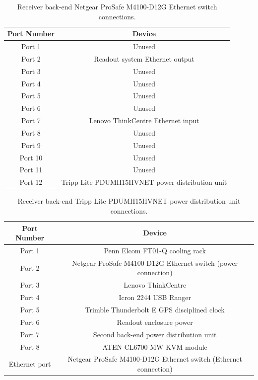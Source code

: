 \begin{table}
    \begin{center}
    \begin{tabular}{ |c|c| }
    \hline
    Port Number & Device \\
    \hline
    Port 1 & Unused \\
    Port 2 & Readout system Ethernet output \\
    Port 3 & Unused \\
    Port 4 & Unused \\
    Port 5 & Unused \\
    Port 6 & Unused \\
    Port 7 & Lenovo ThinkCentre Ethernet input \\
    Port 8 & Unused \\
    Port 9 & Unused \\
    Port 10 & Unused \\
    Port 11 & Unused \\
    Port 12 & Tripp Lite PDUMH15HVNET power distribution unit \\
    \hline
    \end{tabular}
    \caption{Receiver back-end Netgear ProSafe M4100-D12G Ethernet switch connections.}
    \label{tab:eth_switch}
    \end{center}
\end{table}

\begin{table}
    \begin{center}
    \begin{tabular}{ |c|c| }
    \hline
    Port Number & Device \\
    \hline
    Port 1 & Penn Elcom FT01-Q cooling rack\\
    Port 2 & Netgear ProSafe M4100-D12G Ethernet switch (power connection) \\
    Port 3 & Lenovo ThinkCentre \\
    Port 4 & Icron 2244 USB Ranger \\
    Port 5 & Trimble Thunderbolt E GPS disciplined clock\\
    Port 6 & Readout enclosure power \\
    Port 7 & Second back-end power distribution unit \\
    Port 8 & ATEN CL6700 MW KVM module \\
    Ethernet port & Netgear ProSafe M4100-D12G Ethernet switch (Ethernet connection) \\
    \hline
    \end{tabular}
    \caption{Receiver back-end Tripp Lite PDUMH15HVNET power distribution unit connections.}
    \label{tab:backend_pdu}
    \end{center}
\end{table}